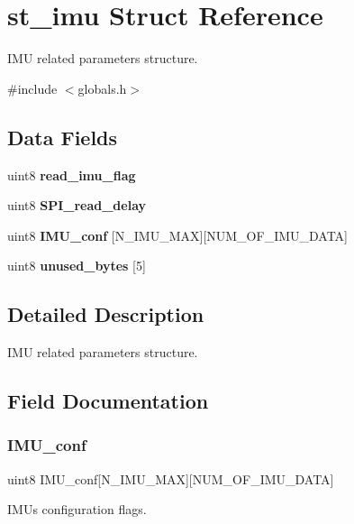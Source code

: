 \section{st\+\_\+imu Struct Reference}
\label{structst__imu}


I\+MU related parameters structure.  




{\ttfamily \#include $<$globals.\+h$>$}

\subsection*{Data Fields}
\begin{DoxyCompactItemize}
\item 
uint8 \textbf{ read\+\_\+imu\+\_\+flag}
\item 
uint8 \textbf{ S\+P\+I\+\_\+read\+\_\+delay}
\item 
uint8 \textbf{ I\+M\+U\+\_\+conf} [N\+\_\+\+I\+M\+U\+\_\+\+M\+AX][N\+U\+M\+\_\+\+O\+F\+\_\+\+I\+M\+U\+\_\+\+D\+A\+TA]
\item 
uint8 \textbf{ unused\+\_\+bytes} [5]
\end{DoxyCompactItemize}


\subsection{Detailed Description}
I\+MU related parameters structure. 



\subsection{Field Documentation}
\mbox{\label{structst__imu_ada640cf3ec631c3b1cba76c486ea6b04}} 
\subsubsection{I\+M\+U\+\_\+conf}
{\footnotesize\ttfamily uint8 I\+M\+U\+\_\+conf[N\+\_\+\+I\+M\+U\+\_\+\+M\+AX][N\+U\+M\+\_\+\+O\+F\+\_\+\+I\+M\+U\+\_\+\+D\+A\+TA]}

I\+M\+Us configuration flags. \mbox{\label{structst__imu_a02e930c22d986c574b7041926068e65d}} 
